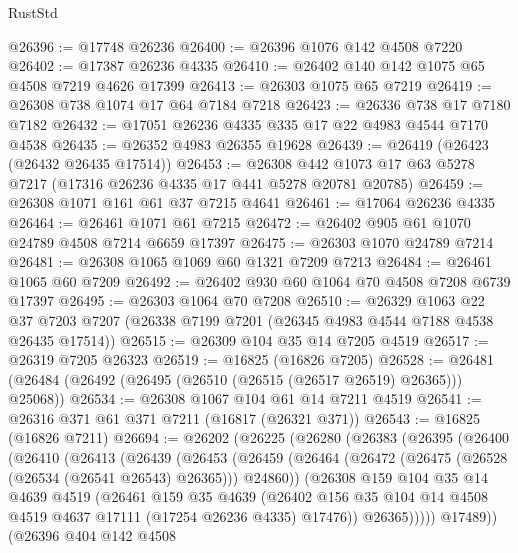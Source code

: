 \begin{lexlean}{RustStd}
\begin{coremodule}
@26396 := @17748 @26236
@26400 := @26396 @1076 @142 @4508 @7220
@26402 := @17387 @26236 @4335
@26410 := @26402 @140 @142 @1075 @65 @4508 @7219 @4626 @17399
@26413 := @26303 @1075 @65 @7219
@26419 := @26308 @738 @1074 @17 @64 @7184 @7218
@26423 := @26336 @738 @17 @7180 @7182
@26432 := @17051 @26236 @4335 @335 @17 @22 @4983 @4544 @7170 @4538
@26435 := @26352 @4983 @26355 @19628
@26439 := @26419 (@26423 (@26432 @26435 @17514))
@26453 := @26308 @442 @1073 @17 @63 @5278 @7217 (@17316 @26236 @4335 @17 @441 @5278 @20781 @20785)
@26459 := @26308 @1071 @161 @61 @37 @7215 @4641
@26461 := @17064 @26236 @4335
@26464 := @26461 @1071 @61 @7215
@26472 := @26402 @905 @61 @1070 @24789 @4508 @7214 @6659 @17397
@26475 := @26303 @1070 @24789 @7214
@26481 := @26308 @1065 @1069 @60 @1321 @7209 @7213
@26484 := @26461 @1065 @60 @7209
@26492 := @26402 @930 @60 @1064 @70 @4508 @7208 @6739 @17397
@26495 := @26303 @1064 @70 @7208
@26510 := @26329
    @1063
    @22
    @37
    @7203
    @7207
    (@26338 @7199 @7201 (@26345 @4983 @4544 @7188 @4538 @26435 @17514))
@26515 := @26309 @104 @35 @14 @7205 @4519
@26517 := @26319 @7205 @26323
@26519 := @16825 (@16826 @7205)
@26528 := @26481 (@26484 (@26492 (@26495 (@26510 (@26515 (@26517 @26519) @26365))) @25068))
@26534 := @26308 @1067 @104 @61 @14 @7211 @4519
@26541 := @26316 @371 @61 @371 @7211 (@16817 (@26321 @371))
@26543 := @16825 (@16826 @7211)
@26694 := @26202
    (@26225
      (@26280
        (@26383
          (@26395
            (@26400
              (@26410
                (@26413
                  (@26439
                    (@26453
                      (@26459
                        (@26464 (@26472 (@26475 (@26528 (@26534 (@26541 @26543) @26365))) @24860))
                        (@26308
                          @159
                          @104
                          @35
                          @14
                          @4639
                          @4519
                          (@26461
                            @159
                            @35
                            @4639
                            (@26402
                              @156
                              @35
                              @104
                              @14
                              @4508
                              @4519
                              @4637
                              @17111
                              (@17254 @26236 @4335)
                              @17476))
                          @26365)))))
                @17489))
            (@26396
              @404
              @142
              @4508

\end{coremodule}
\end{lexlean}
